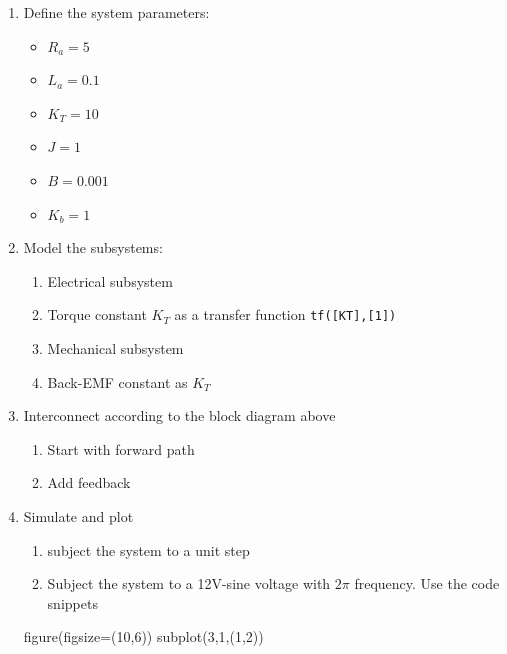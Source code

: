 \documentclass[11pt,a4paper, d]{scrartcl}
\providecommand{\tightlist}{%
      \setlength{\itemsep}{0pt}\setlength{\parskip}{0pt}}
\newenvironment{Shaded}{}{}
\newcommand{\DecValTok}[1]{\textcolor[rgb]{0.25,0.63,0.44}{{#1}}}
\newcommand{\NormalTok}[1]{{#1}}
\newcommand{\OperatorTok}[1]{\textcolor[rgb]{0.40,0.40,0.40}{{#1}}}
\begin{document}
\begin{enumerate}
\def\labelenumi{\arabic{enumi}.}
\tightlist
\item
  Define the system parameters:

  \begin{itemize}
  \tightlist
  \item
    \(R_a = 5\)
  \item
    \(L_a = 0.1\)
  \item
    \(K_T = 10\)
  \item
    \(J = 1\)
  \item
    \(B = 0.001\)
  \item
    \(K_b = 1\)
  \end{itemize}
\item
  Model the subsystems:

  \begin{enumerate}
  \def\labelenumii{\arabic{enumii}.}
  \tightlist
  \item
    Electrical subsystem
  \item
    Torque constant \(K_T\) as a transfer function
    \texttt{tf({[}KT{]},{[}1{]})}
  \item
    Mechanical subsystem
  \item
    Back-EMF constant as \(K_T\)
  \end{enumerate}
\item
  Interconnect according to the block diagram above

  \begin{enumerate}
  \def\labelenumii{\arabic{enumii}.}
  \tightlist
  \item
    Start with forward path
  \item
    Add feedback
  \end{enumerate}
\item
  Simulate and plot

  \begin{enumerate}
  \def\labelenumii{\arabic{enumii}.}
  \tightlist
  \item
    subject the system to a unit step
  \item
    Subject the system to a 12V-sine voltage with \(2\pi\) frequency.
    Use the code snippets
  \end{enumerate}

\begin{Shaded}
\begin{Highlighting}[]
\NormalTok{figure(figsize}\OperatorTok{=}\NormalTok{(}\DecValTok{10}\NormalTok{,}\DecValTok{6}\NormalTok{))}
\NormalTok{subplot(}\DecValTok{3}\NormalTok{,}\DecValTok{1}\NormalTok{,(}\DecValTok{1}\NormalTok{,}\DecValTok{2}\NormalTok{))}
\end{Highlighting}
\end{Shaded}


\end{enumerate}
\end{document}
